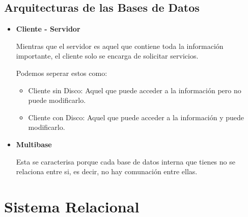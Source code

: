 \documentclass[12pt, fleqn]{report}                             %
\begin{document}
        \clearpage
        \section{Arquitecturas de las Bases de Datos}


            \begin{itemize}

                \item
                    \textbf{Cliente - Servidor}

                    Mientras que el servidor es aquel que contiene toda la información 
                    importante, el cliente solo se encarga de solicitar servicios.

                    Podemos seperar estos como:
                    \begin{itemize}
                        \item Cliente sin Disco:
                            Aquel que puede acceder a la información pero no puede modificarlo.

                        \item Cliente con Disco:
                            Aquel que puede acceder a la información y puede modificarlo.
                     \end{itemize} 


                \item
                    \textbf{Multibase}

                    Esta se caracterisa porque cada base de datos interna que tienes no se relaciona
                    entre si, es decir, no hay comunación entre ellas.

                        
            \end{itemize}



    \chapter{Sistema Relacional}
\end{document}
